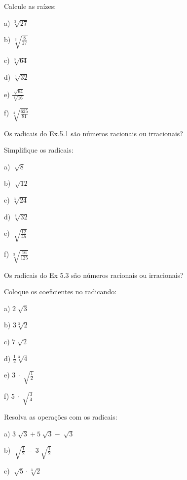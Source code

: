 \begin{exercicios}
	
	\exitem{} Calcule as raízes:

\begin{multicols}{6}
	
	a) \( \sqrt[3]{27} \)
	
	b)  \( \sqrt[3]{\frac{8}{27}} \)
	
	c)  \( \sqrt[3]{64} \)
	
	d)  \( \sqrt[5]{32} \)
	
	e)  \( \frac{\sqrt[]{64}}{\sqrt[4]{16}} \)
	
	f)  \( \sqrt[4]{\frac{625}{81}} \) 
\end{multicols}

	\exitem{} Os radicais do Ex.5.1 são números racionais ou irracionais?

	\exitem{} Simplifique os radicais:
	\begin{multicols}{6}

		 a) \(\sqrt[]{8} \)
		 
		 b)  \( \sqrt[]{12} \)
		 
		 c)  \( \sqrt[3]{24} \)
		 
		 d)  \( \sqrt[4]{32} \) 
		 
		 e)  \( \sqrt[]{\frac{12}{45}} \)
		 
		 f)  \( \sqrt[3]{\frac{16}{125}} \)
	\end{multicols}
	\exitem{} Os radicais do Ex 5.3 são números racionais ou irracionais?

	\exitem{} Coloque os coeficientes no radicando:
	\begin{multicols}{6}
		
	
	a) \( 2 \sqrt[]{3} \)
	
	b)  \( 3 \sqrt[3]{2} \)
	
	c)  \( 7 \sqrt[]{2} \)
	
	d)  \( \frac{1}{2}\sqrt[3]{4} \)
	
	e)  \( 3~ \cdot   \sqrt[]{\frac{1}{2}} \)
	
	f)  \( 5~ \cdot   \sqrt[]{\frac{3}{4}} \) 
	\end{multicols}
	\exitem{} Resolva as operações com os radicais:
	\begin{multicols}{4}
		a)  \( 3 \sqrt[]{3}+5\sqrt[]{3}-\sqrt[]{3} \) ~ \quad ~~~ 
		
		b)  \( \sqrt[]{\frac{1}{2}}-~3  \sqrt[]{\frac{1}{2}} \)
		
		c)  \( \sqrt[]{5}  \cdot  \sqrt[3]{2} \)
		

\end{multicols}
\end{exercicios}
